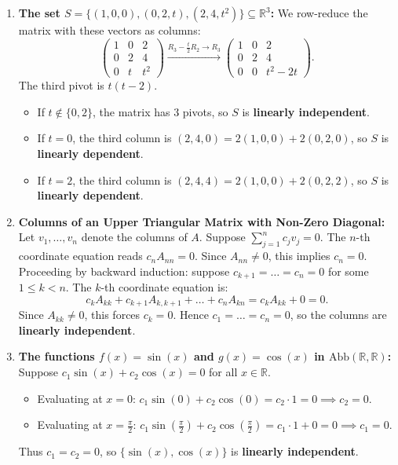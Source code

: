 \begin{exercisesolution*}
\label{sol:linear_independence_various_contexts}
\begin{enumerate}[label=\textbf{(\alph*)}]
    \item \textbf{The set $S = \{(1, 0, 0), (0, 2, t), (2, 4, t^2)\} \subseteq \mathbb{R}^3$:}
    We row-reduce the matrix with these vectors as columns:
    \[
    \begin{pmatrix}
    1 & 0 & 2 \\
    0 & 2 & 4 \\
    0 & t & t^2
    \end{pmatrix}
    \xrightarrow{R_3 - \frac{t}{2} R_2 \to R_3}
    \begin{pmatrix}
    1 & 0 & 2 \\
    0 & 2 & 4 \\
    0 & 0 & t^2 - 2t
    \end{pmatrix}.
    \]
    The third pivot is $t(t - 2)$.
    \begin{itemize}
        \item If $t \notin \{0, 2\}$, the matrix has $3$ pivots, so $S$ is \textbf{linearly independent}.
        \item If $t = 0$, the third column is $(2, 4, 0) = 2(1, 0, 0) + 2(0, 2, 0)$, so $S$ is \textbf{linearly dependent}.
        \item If $t = 2$, the third column is $(2, 4, 4) = 2(1, 0, 0) + 2(0, 2, 2)$, so $S$ is \textbf{linearly dependent}.
    \end{itemize}

    \item \textbf{Columns of an Upper Triangular Matrix with Non-Zero Diagonal:}
    Let $v_1, \dots, v_n$ denote the columns of $A$. Suppose $\sum_{j=1}^n c_j v_j = 0$.
    The $n$-th coordinate equation reads $c_n A_{nn} = 0$. Since $A_{nn} \ne 0$, this implies $c_n = 0$.
    Proceeding by backward induction: suppose $c_{k+1} = \dots = c_n = 0$ for some $1 \le k < n$. The $k$-th coordinate equation is:
    \[
    c_k A_{kk} + c_{k+1} A_{k, k+1} + \dots + c_n A_{kn} = c_k A_{kk} + 0 = 0.
    \]
    Since $A_{kk} \ne 0$, this forces $c_k = 0$.
    Hence $c_1 = \dots = c_n = 0$, so the columns are \textbf{linearly independent}.

    \item \textbf{The functions $f(x) = \sin(x)$ and $g(x) = \cos(x)$ in $\mathrm{Abb}(\mathbb{R}, \mathbb{R})$:}
    Suppose $c_1 \sin(x) + c_2 \cos(x) = 0$ for all $x \in \mathbb{R}$.
    \begin{itemize}
        \item Evaluating at $x = 0$: $c_1 \sin(0) + c_2 \cos(0) = c_2 \cdot 1 = 0 \implies c_2 = 0$.
        \item Evaluating at $x = \frac{\pi}{2}$: $c_1 \sin(\frac{\pi}{2}) + c_2 \cos(\frac{\pi}{2}) = c_1 \cdot 1 + 0 = 0 \implies c_1 = 0$.
    \end{itemize}
    Thus $c_1 = c_2 = 0$, so $\{\sin(x), \cos(x)\}$ is \textbf{linearly independent}.


\end{enumerate}
\end{exercisesolution*}

